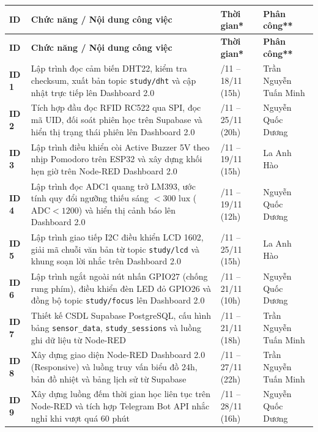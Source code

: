 \begingroup
\setlength{\tabcolsep}{4pt}
\begin{longtable}{|>{\centering\arraybackslash}p{1.4cm}|>{\raggedright\arraybackslash}p{7.8cm}|>{\raggedright\arraybackslash}p{3.4cm}|>{\raggedright\arraybackslash}p{3.8cm}|}
\hline
\textbf{ID} & \textbf{Chức năng / Nội dung công việc} & \textbf{Thời gian*} & \textbf{Phân công**} \\ \hline
\endfirsthead
\hline
\textbf{ID} & \textbf{Chức năng / Nội dung công việc} & \textbf{Thời gian*} & \textbf{Phân công**} \\ \hline
\endhead
\hline
\textbf{ID 1} & Lập trình đọc cảm biến DHT22, kiểm tra checksum, xuất bản topic \texttt{study/dht} và cập nhật trực tiếp lên Dashboard 2.0 & 15/11 -- 18/11 (15h) & Trần Nguyễn Tuấn Minh \\ \hline
\textbf{ID 2} & Tích hợp đầu đọc RFID RC522 qua SPI, đọc mã UID, đối soát phiên học trên Supabase và hiển thị trạng thái phiên lên Dashboard 2.0 & 22/11 -- 25/11 (20h) & Nguyễn Quốc Dương \\ \hline
\textbf{ID 3} & Lập trình điều khiển còi Active Buzzer 5V theo nhịp Pomodoro trên ESP32 và xây dựng khối hẹn giờ trên Node-RED Dashboard 2.0 & 15/11 -- 19/11 (15h) & La Anh Hào \\ \hline
\textbf{ID 4} & Lập trình đọc ADC1 quang trở LM393, ước tính quy đổi ngưỡng thiếu sáng $<300\text{ lux}$ ($\text{ADC}<1200$) và hiển thị cảnh báo lên Dashboard 2.0 & 15/11 -- 19/11 (12h) & Nguyễn Quốc Dương \\ \hline
\textbf{ID 5} & Lập trình giao tiếp I2C điều khiển LCD 1602, giải mã chuỗi văn bản từ topic \texttt{study/lcd} và khung soạn lời nhắc trên Dashboard 2.0 & 22/11 -- 25/11 (15h) & La Anh Hào \\ \hline
\textbf{ID 6} & Lập trình ngắt ngoài nút nhấn GPIO27 (chống rung phím), điều khiển đèn LED đỏ GPIO26 và đồng bộ topic \texttt{study/focus} lên Dashboard 2.0 & 18/11 -- 21/11 (10h) & Nguyễn Quốc Dương \\ \hline
\textbf{ID 7} & Thiết kế CSDL Supabase PostgreSQL, cấu hình bảng \texttt{sensor\_data}, \texttt{study\_sessions} và luồng ghi dữ liệu từ Node-RED & 18/11 -- 21/11 (18h) & Trần Nguyễn Tuấn Minh \\ \hline
\textbf{ID 8} & Xây dựng giao diện Node-RED Dashboard 2.0 (Responsive) và luồng truy vấn biểu đồ 24h, bản đồ nhiệt và bảng lịch sử từ Supabase & 22/11 -- 27/11 (22h) & Trần Nguyễn Tuấn Minh \\ \hline
\textbf{ID 9} & Xây dựng luồng đếm thời gian học liên tục trên Node-RED và tích hợp Telegram Bot API nhắc nghỉ khi vượt quá 60 phút & 25/11 -- 28/11 (16h) & Nguyễn Quốc Dương \\ \hline

\end{longtable}

